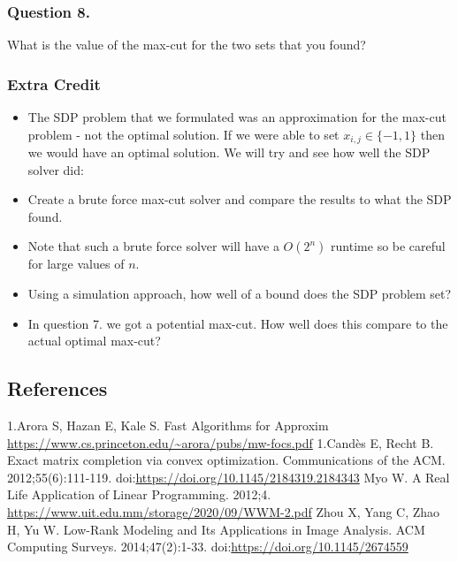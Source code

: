 \documentclass{article}
\begin{document}
\subsubsection{Question 8.}
What is the value of the max-cut for the two sets that you found?


\subsubsection{Extra Credit}
\begin{itemize}
\item\label{item:1} The SDP problem that we formulated was an approximation for the max-cut problem - not the optimal solution. If we were able to set \( x_{i, j} \in \{ -1, 1 \} \) then we would have an optimal solution. We will try and see how well the SDP solver did:
\item\label{item:2}
Create a brute force max-cut solver and compare the results to what the SDP found.
\item\label{item:3}
Note that such a brute force solver will have a \( O(2^n) \) runtime so be careful for large values of \( n \).
\item\label{item:4}
Using a simulation approach, how well of a bound does the SDP problem set?
\item\label{item:5}
In question 7. we got a potential max-cut. How well does this compare to the actual optimal max-cut?
\end{itemize}



\newpage
\subsection{References}
\begin{thebibliography}{12}
 1.Arora S, Hazan E, Kale S. Fast Algorithms for Approxim \url{https://www.cs.princeton.edu/~arora/pubs/mw-focs.pdf}
 1.Candès E, Recht B. Exact matrix completion via convex optimization. Communications of the ACM. 2012;55(6):111-119. doi:\url{https://doi.org/10.1145/2184319.2184343}
 Myo W. A Real Life Application of Linear Programming. 2012;4. \url{https://www.uit.edu.mm/storage/2020/09/WWM-2.pdf}
 Zhou X, Yang C, Zhao H, Yu W. Low-Rank Modeling and Its Applications in Image Analysis. ACM Computing Surveys. 2014;47(2):1-33. doi:\url{https://doi.org/10.1145/2674559}
‌
\end{thebibliography}
\end{document}
